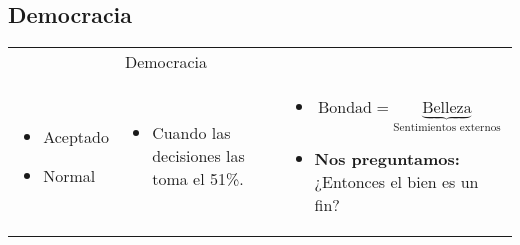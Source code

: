 \subsection{Democracia}
\begin{center}
   \begin{tabular}{ | p{5cm} | p{5cm} | p{5cm} | }
       \hline
            & Democracia & \\ 
            
            \begin{itemize} 
                \item Aceptado 
                \item Normal 
            \end{itemize} & 
            \begin{itemize}
                \item Cuando las decisiones las toma el 51\%.
            \end{itemize} & 
             \begin{itemize}
                 \item \[
                   \text{Bondad} = \underbrace{\text{Belleza}}_{\text{Sentimientos externos}}
                 \]
                 
                 \item \textbf{Nos preguntamos:} ¿Entonces el bien es un fin?
             \end{itemize}\\ 
            
       \hline
   \end{tabular}
\end{center}


